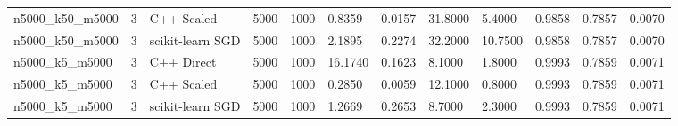 \begin{table}[htbp]
\begin{tabular}{llllllllllll}
n5000\_k50\_m5000 & 3 & C++ Scaled & 5000 & 1000 & 0.8359 & 0.0157 & 31.8000 & 5.4000 & 0.9858 & 0.7857 & 0.0070 \\
n5000\_k50\_m5000 & 3 & scikit-learn SGD & 5000 & 1000 & 2.1895 & 0.2274 & 32.2000 & 10.7500 & 0.9858 & 0.7857 & 0.0070 \\
n5000\_k5\_m5000 & 3 & C++ Direct & 5000 & 1000 & 16.1740 & 0.1623 & 8.1000 & 1.8000 & 0.9993 & 0.7859 & 0.0071 \\
n5000\_k5\_m5000 & 3 & C++ Scaled & 5000 & 1000 & 0.2850 & 0.0059 & 12.1000 & 0.8000 & 0.9993 & 0.7859 & 0.0071 \\
n5000\_k5\_m5000 & 3 & scikit-learn SGD & 5000 & 1000 & 1.2669 & 0.2653 & 8.7000 & 2.3000 & 0.9993 & 0.7859 & 0.0071 \\
\bottomrule
\end{tabular}
\end{table}
